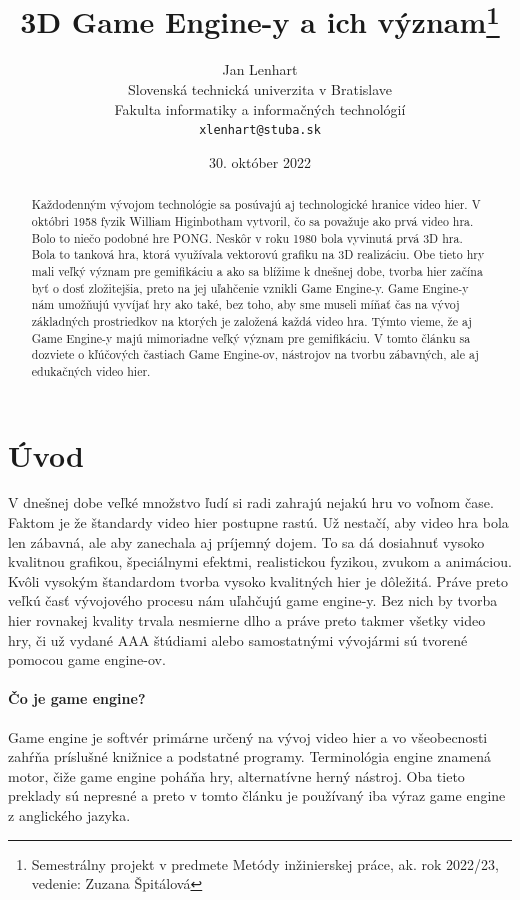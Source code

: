 \documentclass[10pt,oneside,slovak,a4paper,hidelinks]{article}
\title{3D Game Engine-y a ich význam\thanks{Semestrálny projekt v predmete Metódy inžinierskej práce, ak. rok 2022/23, vedenie: Zuzana Špitálová}} %
\author{Jan Lenhart\\[2pt]
	{\small Slovenská technická univerzita v Bratislave}\\
	{\small Fakulta informatiky a informačných technológií}\\
	{\small \texttt{xlenhart@stuba.sk}}
}
\date{\small 30. október 2022} %
\begin{document}
	
	\maketitle
	
	\vspace*{\fill}
	\begin{abstract}
		Každodenným vývojom technológie sa posúvajú aj technologické hranice video hier. V októbri 1958 fyzik William Higinbotham vytvoril, čo sa považuje ako prvá video hra. Bolo to niečo podobné hre PONG. Neskôr v roku 1980 bola vyvinutá prvá 3D hra. Bola to tanková hra, ktorá využívala vektorovú grafiku na 3D realizáciu. Obe tieto hry mali veľký význam pre gemifikáciu a ako sa blížime k dnešnej dobe, tvorba hier začína byť o dosť zložitejšia, preto na jej uľahčenie vznikli Game Engine-y. Game Engine-y nám umožňujú vyvíjať hry ako také, bez toho, aby sme museli míňať čas na vývoj základných prostriedkov na ktorých je založená každá video hra. Týmto vieme, že aj Game Engine-y majú mimoriadne veľký význam pre gemifikáciu. V tomto článku sa dozviete o kľúčových častiach Game Engine-ov, nástrojov na tvorbu zábavných, ale aj edukačných video hier.
	\end{abstract}
	\vspace*{\fill}
	
	\pagebreak
	
	\section{Úvod}
		V dnešnej dobe veľké množstvo ľudí si radi zahrajú nejakú hru vo voľnom čase. Faktom je že štandardy video hier postupne rastú. Už nestačí, aby video hra bola len zábavná, ale aby zanechala aj príjemný dojem. To sa dá dosiahnuť vysoko kvalitnou grafikou, špeciálnymi efektmi, realistickou fyzikou, zvukom a animáciou. Kvôli vysokým štandardom tvorba vysoko kvalitných hier je dôležitá. Práve preto veľkú časť vývojového procesu nám uľahčujú game engine-y. Bez nich by tvorba hier rovnakej kvality trvala nesmierne dlho a práve preto takmer všetky video hry, či už vydané AAA štúdiami alebo samostatnými vývojármi sú tvorené pomocou game engine-ov.
		\paragraph{Čo je game engine?} Game engine je softvér primárne určený na vývoj video hier a vo všeobecnosti zahŕňa príslušné knižnice a podstatné programy. Terminológia engine znamená motor, čiže game engine poháňa hry, alternatívne herný nástroj. Oba tieto preklady sú nepresné a preto v tomto článku je používaný iba výraz game engine z anglického jazyka.
\end{document}
